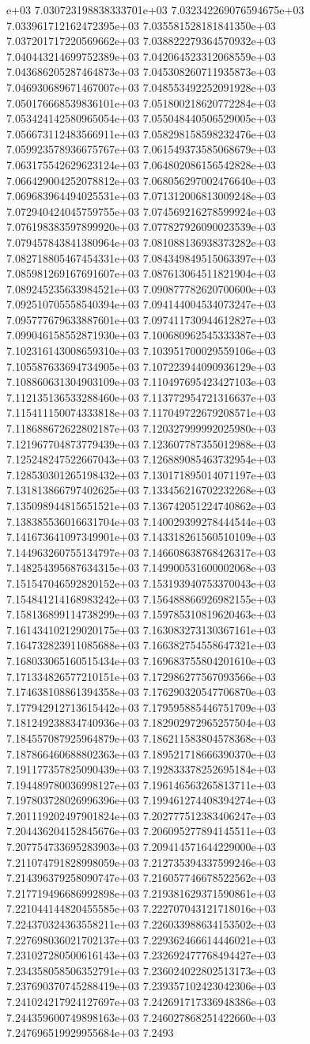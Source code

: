 e+03	7.030723198838333701e+03	7.032342269076594675e+03	7.033961712162472395e+03	7.035581528181841350e+03	7.037201717220569662e+03	7.038822279364570932e+03	7.040443214699752389e+03	7.042064523312068559e+03	7.043686205287464873e+03	7.045308260711935873e+03	7.046930689671467007e+03	7.048553492252091928e+03	7.050176668539836101e+03	7.051800218620772284e+03	7.053424142580965054e+03	7.055048440506529005e+03	7.056673112483566911e+03	7.058298158598232476e+03	7.059923578936675767e+03	7.061549373585068679e+03	7.063175542629623124e+03	7.064802086156542828e+03	7.066429004252078812e+03	7.068056297002476640e+03	7.069683964494025531e+03	7.071312006813009248e+03	7.072940424045759755e+03	7.074569216278599924e+03	7.076198383597899920e+03	7.077827926090023539e+03	7.079457843841380964e+03	7.081088136938373282e+03	7.082718805467454331e+03	7.084349849515063397e+03	7.085981269167691607e+03	7.087613064511821904e+03	7.089245235633984521e+03	7.090877782620700600e+03	7.092510705558540394e+03	7.094144004534073247e+03	7.095777679633887601e+03	7.097411730944612827e+03	7.099046158552871930e+03	7.100680962545333387e+03	7.102316143008659310e+03	7.103951700029559106e+03	7.105587633694734905e+03	7.107223944090936129e+03	7.108860631304903109e+03	7.110497695423427103e+03	7.112135136533288460e+03	7.113772954721316637e+03	7.115411150074333818e+03	7.117049722679208571e+03	7.118688672622802187e+03	7.120327999992025980e+03	7.121967704873779439e+03	7.123607787355012988e+03	7.125248247522667043e+03	7.126889085463732954e+03	7.128530301265198432e+03	7.130171895014071197e+03	7.131813866797402625e+03	7.133456216702232268e+03	7.135098944815651521e+03	7.136742051224740862e+03	7.138385536016631704e+03	7.140029399278444544e+03	7.141673641097349901e+03	7.143318261560510109e+03	7.144963260755134797e+03	7.146608638768426317e+03	7.148254395687634315e+03	7.149900531600002068e+03	7.151547046592820152e+03	7.153193940753370043e+03	7.154841214168983242e+03	7.156488866926982155e+03	7.158136899114738299e+03	7.159785310819620463e+03	7.161434102129020175e+03	7.163083273130367161e+03	7.164732823911085688e+03	7.166382754558647321e+03	7.168033065160515434e+03	7.169683755804201610e+03	7.171334826577210151e+03	7.172986277567093566e+03	7.174638108861394358e+03	7.176290320547706870e+03	7.177942912713615442e+03	7.179595885446751709e+03	7.181249238834740936e+03	7.182902972965257504e+03	7.184557087925964879e+03	7.186211583804578368e+03	7.187866460688802363e+03	7.189521718666390370e+03	7.191177357825090439e+03	7.192833378252695184e+03	7.194489780036998127e+03	7.196146563265813711e+03	7.197803728026996396e+03	7.199461274408394274e+03	7.201119202497901824e+03	7.202777512383406247e+03	7.204436204152845676e+03	7.206095277894145511e+03	7.207754733695283903e+03	7.209414571644229000e+03	7.211074791828998059e+03	7.212735394337599246e+03	7.214396379258090747e+03	7.216057746678522562e+03	7.217719496686992898e+03	7.219381629371590861e+03	7.221044144820455585e+03	7.222707043121718016e+03	7.224370324363558211e+03	7.226033988634153502e+03	7.227698036021702137e+03	7.229362466614446021e+03	7.231027280500616143e+03	7.232692477768494427e+03	7.234358058506352791e+03	7.236024022802513173e+03	7.237690370745288419e+03	7.239357102423042306e+03	7.241024217924127697e+03	7.242691717336948386e+03	7.244359600749898163e+03	7.246027868251422660e+03	7.247696519929955684e+03	7.2493
